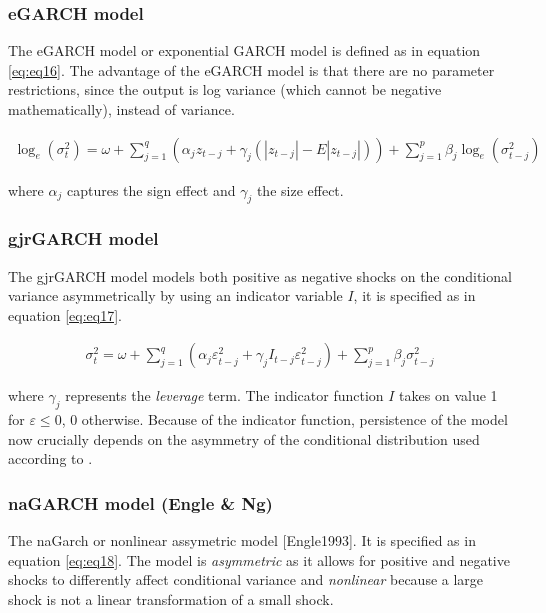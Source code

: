 \documentclass[a4paper, twoside]{templates/ociamthesis}
\begin{document}
\hypertarget{egarch-model}{%
\subsubsection{eGARCH model}\label{egarch-model}}

The eGARCH model or exponential GARCH model \autocite{nelson1991} is defined as in equation \eqref{eq:eq16}. The advantage of the eGARCH model is that there are no parameter restrictions, since the output is log variance (which cannot be negative mathematically), instead of variance.

\begin{align}
\log_e(\sigma_t^2) = \omega + \sum\limits_{j=1}^q (\alpha_j z_{t-j} + \gamma_j (|z_{t-j}| - E|z_{t-j}|))+ \sum\limits_{j = 1}^p \beta_j \log_e(\sigma_{t-j}^2)
 \label{eq:eq16}
\end{align}

where \(\alpha_j\) captures the sign effect and \(\gamma_j\) the size effect.

\hypertarget{gjrgarch-model}{%
\subsubsection{gjrGARCH model}\label{gjrgarch-model}}

The gjrGARCH model \autocite{glosten1993} models both positive as negative shocks on the conditional variance asymmetrically by using an indicator variable \(I\), it is specified as in equation \eqref{eq:eq17}.

\begin{align}
\sigma_t^2 = \omega + \sum\limits_{j=1}^q (\alpha_j \varepsilon_{t-j}^2 + \gamma_j I_{t-j} \varepsilon_{t-j}^2) + \sum\limits_{j = 1}^p \beta_j \sigma_{t-j}^2
 \label{eq:eq17}
\end{align}

where \(\gamma_j\) represents the \emph{leverage} term. The indicator function \(I\) takes on value 1 for \(\varepsilon \le 0\), 0 otherwise. Because of the indicator function, persistence of the model now crucially depends on the asymmetry of the conditional distribution used according to \textcite{ghalanos2020}.

\hypertarget{nagarch-model-engle-ng}{%
\subsubsection{naGARCH model (Engle \& Ng)}\label{nagarch-model-engle-ng}}

The naGarch or nonlinear assymetric model {[}Engle1993{]}. It is specified as in equation \eqref{eq:eq18}. The model is \emph{asymmetric} as it allows for positive and negative shocks to differently affect conditional variance and \emph{nonlinear} because a large shock is not a linear transformation of a small shock.
\end{document}
